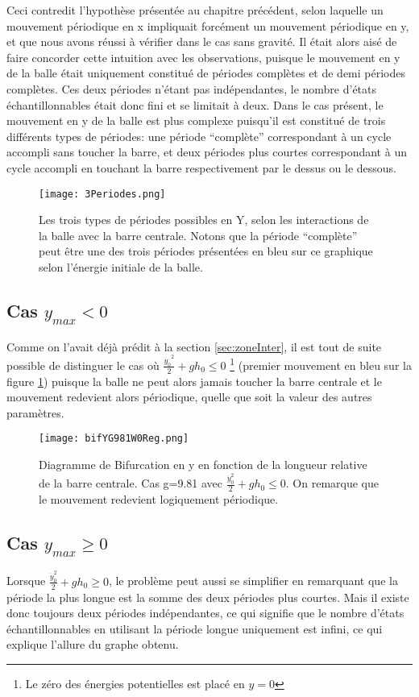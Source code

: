 \documentclass[a4paper]{report}
\begin{document}
Ceci contredit l'hypothèse présentée au chapitre précédent, selon laquelle un mouvement périodique en x impliquait forcément un mouvement périodique en y, et que nous avons réussi à vérifier dans le cas sans gravité. Il était alors aisé de faire concorder cette intuition avec les observations, puisque le mouvement en y de la balle était uniquement constitué de périodes complètes et de demi périodes complètes. Ces deux périodes n'étant pas indépendantes, le nombre d'états échantillonnables était donc fini et se limitait à deux. Dans le cas présent, le mouvement en y de la balle est plus complexe puisqu'il est constitué de trois différents types de périodes: une période ``complète'' correspondant à un cycle accompli sans toucher la barre, et deux périodes plus courtes correspondant à un cycle accompli en touchant la barre respectivement par le dessus ou le dessous.
\begin{figure}[h!]
   \texttt{[image: 3Periodes.png]}
      \caption[Les trois types de périodes possible en Y]{Les trois types de périodes possibles en Y, selon les interactions de la balle avec la barre centrale. Notons que la période ``complète'' peut être une des trois périodes présentées en bleu sur ce graphique selon l'énergie initiale de la balle.}
   \label{fig:typesPeriodes}
\end{figure}

\subsection{Cas $ y_{max}<0 $}
Comme on l'avait déjà prédit à la section \ref{sec:zoneInter}, il est tout de suite possible de distinguer le cas où \(\frac{\dot{y_0}^2}{2} + gh_0 \leq 0\) \footnote{Le zéro des énergies potentielles est placé en \(y=0\)} (premier mouvement en bleu sur la figure \ref{fig:typesPeriodes}) puisque la balle ne peut alors jamais toucher la barre centrale et le mouvement redevient alors périodique, quelle que soit la valeur des autres paramètres.
\begin{figure}[H]
   \texttt{[image: bifYG981W0Reg.png]}
      \caption[Diagramme de Bifurcation en y: g=9.81 \( \omega=0 \; \, \frac{\dot{y_0}^2}{2} + gh_0 \leq 0\)]{Diagramme de Bifurcation en y en fonction de la longueur relative de la barre centrale. Cas g=9.81 avec \(\frac{\dot{y}_0^2}{2} + gh_0 \leq 0\). On remarque que le mouvement redevient logiquement périodique.}
\end{figure}

\subsection{Cas $ y_{max} \geq 0 $}
Lorsque \(\frac{\dot{y}_0^2}{2} + gh_0 \geq 0\), le problème peut aussi se simplifier en remarquant que la période la plus longue est la somme des deux périodes plus courtes\label{propr:sommePeriodes}. Mais il existe donc toujours deux périodes indépendantes, ce qui signifie que le nombre d'états échantillonnables en utilisant la période longue uniquement est infini, ce qui explique l'allure du graphe obtenu.
\end{document}
